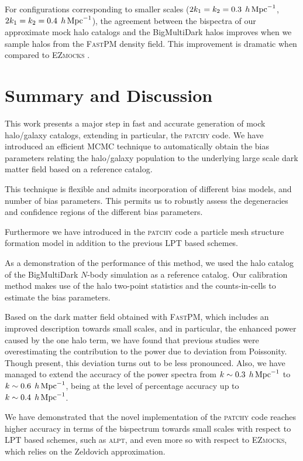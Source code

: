 For configurations corresponding to smaller scales ($2k_1=k_2=0.3\;\,h\,{\rm Mpc}^{-1}$, $2k_1=k_2=0.4\;\,h\,{\rm Mpc}^{-1}$), the agreement between the bispectra of our approximate mock halo catalogs and the BigMultiDark halos improves when we sample halos from the \textsc{FastPM} density field. This improvement is dramatic when compared to \textsc{EZmocks} \citep[see real-space lines in the lower panels in Fig.~5 of][]{eazymock}.


\section{Summary and Discussion}
\label{sec:mockdiscussion}


This work presents a major step in fast and accurate generation of mock halo/galaxy catalogs, extending in particular, the \textsc{patchy} code. We have introduced an efficient MCMC technique to automatically obtain the bias parameters relating the halo/galaxy population to the underlying large scale dark matter field based on a reference catalog. 

This technique is flexible and admits incorporation of different bias models, and number of bias parameters. This permits us to robustly assess the degeneracies and confidence regions of the different bias parameters.

Furthermore we have introduced in the \textsc{patchy} code a particle mesh structure formation model \citep[the \textsc{FastPM} code, see][]{fastpm} in addition to the previous LPT based schemes.


As a demonstration of the performance of this method, we used the halo catalog of the BigMultiDark $N$-body simulation as a reference catalog. Our calibration method makes use of the halo two-point statistics and the counts-in-cells to estimate the bias parameters. 

Based on the dark matter field obtained with \textsc{FastPM}, which includes an improved description towards small scales, and in particular, the enhanced power caused by the one halo term, we have found that previous studies were overestimating the contribution to the power due to deviation from Poissonity. Though present, this deviation turns out to be less pronounced. Also, we have managed to extend the accuracy of the power spectra from $k\sim 0.3\; \,h\,{\rm Mpc}^{-1}$ to $k\sim 0.6 \;\,h\,{\rm Mpc}^{-1}$, being at the level of percentage accuracy up to $k\sim 0.4\; \,h\,{\rm Mpc}^{-1}$.

We have demonstrated that the novel implementation of the \textsc{patchy} code reaches higher accuracy in terms of the bispectrum towards small scales with respect to  LPT based schemes, such as \textsc{alpt}, and even more so with respect to \textsc{EZmocks}, which relies on the Zeldovich approximation. 

